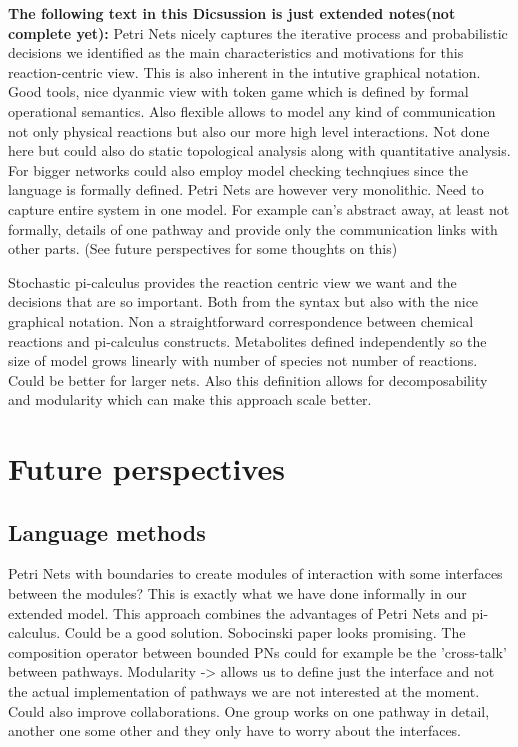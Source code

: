 \textbf{The following text in this Dicsussion is just extended notes(not complete yet):}
Petri Nets nicely captures the iterative process and probabilistic
decisions we identified as the main characteristics and motivations
for this reaction-centric view. This is also inherent in the intutive
graphical notation. Good tools, nice dyanmic view with token game
which is defined by formal operational semantics. Also flexible allows
to model any kind of communication not only physical reactions but
also our more high level interactions. Not done here but
could also do static topological analysis along with quantitative
analysis. For bigger networks could also employ model checking
technqiues since the language is formally defined. Petri Nets are
however very monolithic. Need to capture entire system in one
model. For example can's abstract away, at least not formally, details of one pathway and
provide only the communication links with other parts. (See future
perspectives for some thoughts on this)

Stochastic pi-calculus provides the reaction centric view we want and
the decisions that are so important. Both from the syntax but also
with the nice graphical notation. Non a straightforward correspondence
between chemical reactions and pi-calculus constructs. Metabolites
defined independently so the size of model grows linearly with number
of species not number of reactions. Could be better for larger
nets. Also this definition allows for decomposability and modularity
which can make this approach scale better.

\section{Future perspectives}

\subsection{Language methods}
Petri Nets with boundaries to create modules of interaction with some
interfaces between the modules? This is exactly what we have done
informally in our extended model. This approach combines the
advantages of Petri Nets and pi-calculus. Could be a good
solution. Sobocinski paper looks promising. The composition operator
between bounded PNs could for example be the 'cross-talk' between
pathways. Modularity -> allows us to define just the interface and not
the actual implementation of pathways we are not interested at the
moment. Could also improve collaborations. One group works on one
pathway in detail, another one some other and they only have to worry
about the interfaces.

